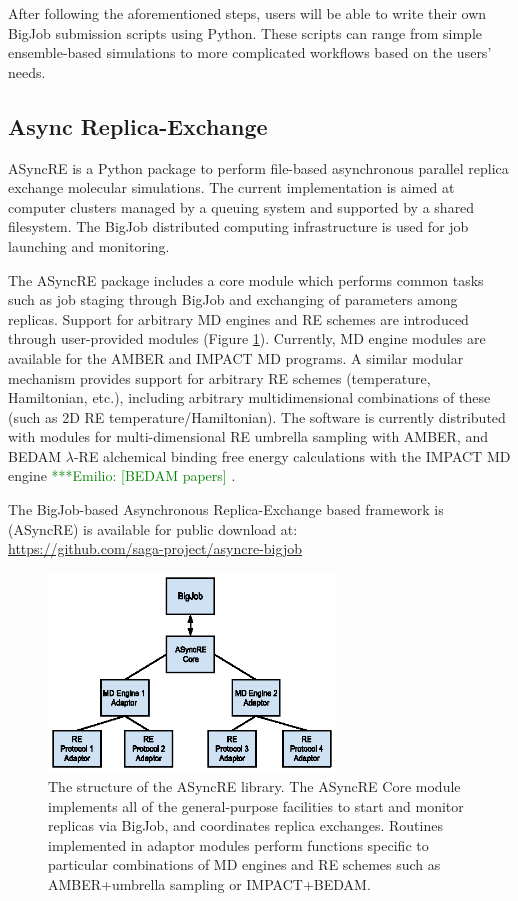 \documentclass{sig-alternate}
\newcommand{\egnote}[1]{ {\textcolor{green} { ***Emilio: #1 }}}
\newcommand{\egnote}[1]{ {}}
\begin{document}
After following the aforementioned steps, users will be able to write
their own BigJob submission scripts using Python. These scripts can
range from simple ensemble-based simulations to more complicated
workflows based on the users' needs.

\subsection{Async Replica-Exchange}

ASyncRE is a Python package to perform file-based asynchronous
parallel replica exchange molecular simulations. The current
implementation is aimed at computer clusters managed by a queuing
system and supported by a shared filesystem. The BigJob distributed
computing infrastructure is used for job launching and monitoring.

The ASyncRE package includes a core module which performs common tasks
such as job staging through BigJob and exchanging of parameters among
replicas. Support for arbitrary MD engines and RE schemes are
introduced through user-provided modules (Figure \ref{fig:aRE_chart}). Currently, MD
engine modules are available for the AMBER and IMPACT MD programs. A
similar modular mechanism provides support for arbitrary RE schemes
(temperature, Hamiltonian, etc.), including arbitrary multidimensional
combinations of these (such as 2D RE temperature/Hamiltonian). The
software is currently distributed with modules for multi-dimensional RE
umbrella sampling with AMBER\cite{AMBER12}, and BEDAM $\lambda$-RE alchemical binding
free energy calculations with the IMPACT MD engine \egnote{[BEDAM papers]}.

The BigJob-based Asynchronous Replica-Exchange based framework is (ASyncRE) is available for public download at: \\
\url{https://github.com/saga-project/asyncre-bigjob}

\begin{figure}
\includegraphics[width=3in]{asyncre.eps}
\caption{\label{fig:aRE_chart}The structure of the ASyncRE
  library. The ASyncRE Core module implements all of the
  general-purpose facilities to start and monitor replicas via BigJob,
  and coordinates replica exchanges. Routines implemented in adaptor
  modules perform functions specific to particular combinations of MD
  engines and RE schemes such as AMBER+umbrella sampling or IMPACT+BEDAM.  }
\end{figure}
\end{document}
